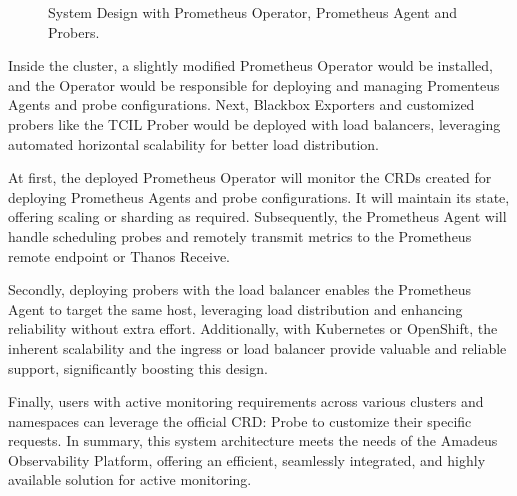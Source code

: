 \begin{figure}[htpb]
  \caption[System Design - Prometheus Operator, Prometheus Agent and Probers]{System Design with Prometheus Operator, Prometheus Agent and Probers.}\label{fig:system-design}
\end{figure}

Inside the cluster, a slightly modified Prometheus Operator would be installed, and the Operator would be responsible for deploying and managing Promenteus Agents and probe configurations. Next, Blackbox Exporters and customized probers like the \ac{TCIL} Prober would be deployed with load balancers, leveraging automated horizontal scalability for better load distribution. 

At first, the deployed Prometheus Operator will monitor the \ac{CRD}s created for deploying Prometheus Agents and probe configurations. It will maintain its state, offering scaling or sharding as required. Subsequently, the Prometheus Agent will handle scheduling probes and remotely transmit metrics to the Prometheus remote endpoint or Thanos Receive. 

Secondly, deploying probers with the load balancer enables the Prometheus Agent to target the same host, leveraging load distribution and enhancing reliability without extra effort. Additionally, with Kubernetes or OpenShift, the inherent scalability and the ingress or load balancer provide valuable and reliable support, significantly boosting this design. 

Finally, users with active monitoring requirements across various clusters and namespaces can leverage the official \ac{CRD}: Probe to customize their specific requests. In summary, this system architecture meets the needs of the Amadeus Observability Platform, offering an efficient, seamlessly integrated, and highly available solution for active monitoring. 

